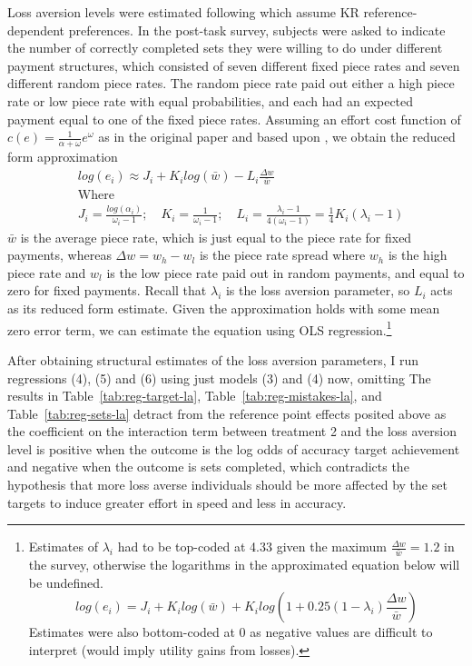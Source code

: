 \documentclass[12pt, letterpaper]{article}
\begin{document}
Loss aversion levels were estimated following \textcite{campos-mercade.2024.gustibusdisputes} which assume KR reference-dependent preferences. In the post-task survey, subjects were asked to indicate the number of correctly completed sets they were willing to do under different payment structures, which consisted of seven different fixed piece rates and seven different random piece rates. The random piece rate paid out either a high piece rate or low piece rate with equal probabilities, and each had an expected payment equal to one of the fixed piece rates. Assuming an effort cost function of $c(e) = \frac {1}{\alpha + \omega} e^\omega$ as in the original paper and based upon \textcite{augenblick.2019.experimenttime}, we obtain the reduced form approximation
\[
\begin{aligned}
& log(e_i) \approx J_i + K_i log(\bar{w}) - L_i \frac{\Delta w}{\bar w} \\
& \text{Where} \\
& J_i = \frac {log(\alpha_i)}{\omega_i - 1}; \quad K_i = \frac {1}{\omega_i - 1}; \quad L_i = \frac {\lambda_i -1}{4(\omega_i - 1)} = \frac {1}{4} K_i (\lambda_i -1)
\end{aligned}
\]
$\bar w$ is the average piece rate, which is just equal to the piece rate for fixed payments, whereas $\Delta w = w_h - w_l$ is the piece rate spread where $w_h$ is the high piece rate and $w_l$ is the low piece rate paid out in random payments, and equal to zero for fixed payments. Recall that $\lambda_i$ is the loss aversion parameter, so $L_i$ acts as its reduced form estimate. Given the approximation holds with some mean zero error term, we can estimate the equation using OLS regression.\footnote{Estimates of $\lambda_i$ had to be top-coded at 4.33 given the maximum $\frac{\Delta w}{\bar w} = 1.2$ in the survey, otherwise the logarithms in the approximated equation below will be undefined.
  \[
  log(e_i) = J_i + K_i log(\bar{w}) + K_i log(1 + 0.25 (1 - \lambda_i) \frac{\Delta w}{\bar w})
  \]
  Estimates were also bottom-coded at 0 as negative values are difficult to interpret (would imply utility gains from losses).}

After obtaining structural estimates of the loss aversion parameters, I run regressions (4), (5) and (6) using just models (3) and (4) now, omitting The results in Table~\ref{tab:reg-target-la}, Table~\ref{tab:reg-mistakes-la}, and Table~\ref{tab:reg-sets-la} detract from the reference point effects posited above as the coefficient on the interaction term between treatment 2 and the loss aversion level is positive when the outcome is the log odds of accuracy target achievement and negative when the outcome is sets completed, which contradicts the hypothesis that more loss averse individuals should be more affected by the set targets to induce greater effort in speed and less in accuracy.
\end{document}
